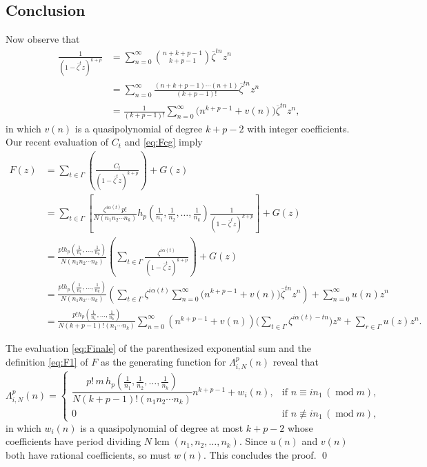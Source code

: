 \documentclass[10pt,reqno]{amsart}
\newcommand{\lcm}{\operatorname{lcm}}
\newcommand{\0}{\color{lightgray}0}
\renewcommand{\pmod}[1]{\,(\operatorname{mod} #1)}
\renewcommand\>{\rangle}
\newcommand\<{\langle}
\theoremstyle{plain}
\theoremstyle{definition}
\begin{document}
\subsection{Conclusion}

Now observe that
\begin{align*}
\frac{1}{(1 - \overline{\zeta}^t z)^{k+p}}
&= \sum_{n=0}^\infty \binom{n + k + p - 1}{k + p - 1} \overline{\zeta}^{tn}z^n \\
&= \sum_{n=0}^\infty \frac{(n + k + p - 1) \cdots (n + 1)}{(k + p - 1)!} \overline{\zeta}^{tn}z^n \\ 
&= \frac{1}{(k + p - 1)!} \sum_{n=0}^\infty \big(n^{k+p-1} + v(n)\big) \overline{\zeta}^{tn} z^n,
\end{align*}
in which $v(n)$ is a quasipolynomial of degree $k + p - 2$ with integer coefficients.
Our recent evaluation of $C_t$ and \eqref{eq:Fcg} imply
\begin{align*}
F(z)
&=\sum_{t \in \Gamma}\left( \frac{C_t}{(1 - \overline{\zeta}^t z)^{k+p}} \right)+ G(z)\\ 
&=\sum_{t \in \Gamma} \left[\frac{\zeta^{i\alpha(t)} p!}{N (n_1 n_2\cdots n_k)} h_p \left( \frac{1}{n_1}, \frac{1}{n_2}, \ldots, \frac{1}{n_k} \right)  \frac{1}{(1 - \overline{\zeta}^t z)^{k+p}} \right]+ G(z)\\
&= \frac{ p!h_p ( \frac{1}{n_1}, \ldots, \frac{1}{n_k} )}{N (n_1 n_2\cdots n_k)} 
\left(\sum_{t\in \Gamma}\frac{\zeta^{i\alpha(t)}}{(1 - \overline{\zeta}^t z)^{k+p}} \right) + G(z)\\
&= \frac{ p!h_p ( \frac{1}{n_1}, \ldots, \frac{1}{n_k} )}{N (n_1 n_2\cdots n_k)} 
\left(\sum_{t\in \Gamma} \zeta^{i\alpha(t)} \sum_{n=0}^{\infty} \big(n^{k+p-1} + v(n)\big) \overline{\zeta}^{tn}z^n\right) + \sum_{n=0}^{\infty} u(n)z^n\\
&=\frac{p! h_p ( \frac{1}{n_1}, \ldots, \frac{1}{n_k} )}{N(k + p - 1)! (n_1 \cdots n_k)}
\sum_{n=0}^{\infty}  (n^{k+p-1}+v(n)) \Big(\sum_{t \in \Gamma} \zeta^{i\alpha(t)-tn}\Big)z^n + \sum_{r\in \Gamma} u(z)z^n.
\end{align*}

The evaluation \eqref{eq:Finale} of the parenthesized exponential sum 
and the definition \eqref{eq:F1} of $F$ as the generating function 
for $\Lambda^p_{i,N}(n)$ reveal that
\begin{equation*}
\Lambda^p_{i,N}(n) 
=
\begin{cases}
\dfrac{p! \,m\, h_p ( \frac{1}{n_1}, \frac{1}{n_2}, \ldots, \frac{1}{n_k} )}{N(k + p - 1)! (n_1 n_2 \cdots n_k)}  n^{k+p-1} + w_i(n),
&\text{if $n \equiv in_1 \pmod{m}$},\\[8pt]
0 & \text{if $n \not\equiv in_1 \pmod{m}$},
\end{cases}
\end{equation*}
in which $w_i(n)$ is a quasipolynomial of degree at most $k+p-2$ whose coefficients have period dividing 
$N\lcm(n_1,n_2,\ldots,n_k)$.  Since $u(n)$ and $v(n)$ both have rational coefficients, so must $w(n)$.  
This concludes the proof. \qed
\end{document}
